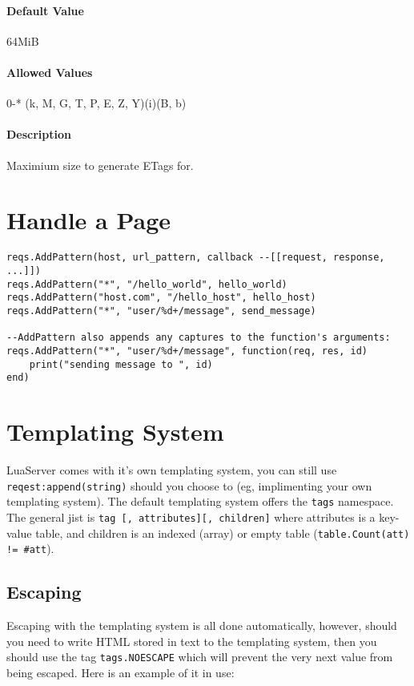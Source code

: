 \documentclass[a4paper,11pt]{report}
\newcommand{\inlinecode}{\texttt}
\begin{document}
\subsubsection{Default Value}{64MiB}
\subsubsection{Allowed Values}{0-* (k, M, G, T, P, E, Z, Y)(i)(B, b)}
\subsubsection{Description}{Maximium size to generate ETags for.}

\chapter{Handle a Page}

\begin{lstlisting}
reqs.AddPattern(host, url_pattern, callback --[[request, response, ...]])
reqs.AddPattern("*", "/hello_world", hello_world)
reqs.AddPattern("host.com", "/hello_host", hello_host)
reqs.AddPattern("*", "user/%d+/message", send_message)

--AddPattern also appends any captures to the function's arguments:
reqs.AddPattern("*", "user/%d+/message", function(req, res, id)
    print("sending message to ", id)
end)
\end{lstlisting}

\chapter{Templating System}

LuaServer comes with it's own templating system, you can still use \inlinecode{reqest:append(string)} should you choose to (eg, implimenting your own templating system).
The default templating system offers the \inlinecode{tags} namespace.
The general jist is \inlinecode{tag [, attributes][, children]} where attributes is a key-value table, and children is an indexed (array) or empty table (\inlinecode{table.Count(att) != \#att}).

\section{Escaping}
Escaping with the templating system is all done automatically, however, should you need to write HTML stored in text to the templating system, then you should use the tag \inlinecode{tags.NOESCAPE} which will prevent the very next value from being escaped. Here is an example of it in use:
\end{document}
